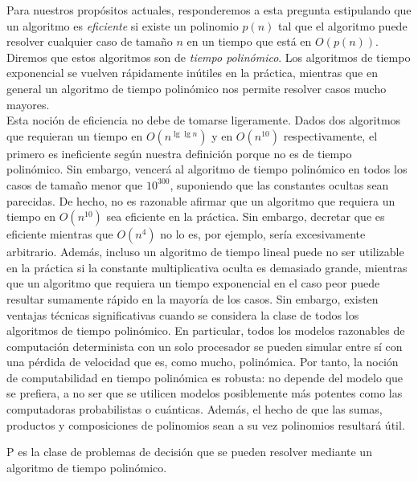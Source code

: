 Para nuestros propósitos actuales, responderemos a esta pregunta estipulando que un algoritmo es \emph{eficiente} si existe un polinomio $p(n)$ tal que el algoritmo puede resolver cualquier caso de tamaño $n$ en un tiempo que está en $O(p(n))$. Diremos que estos algoritmos son de \emph{tiempo polinómico}. Los algoritmos de tiempo exponencial se vuelven rápidamente inútiles en la práctica, mientras que en general un algoritmo de tiempo polinómico nos permite resolver casos mucho mayores.\\

Esta noción de eficiencia no debe de tomarse ligeramente. Dados dos algoritmos que requieran un tiempo en $O(n^{\lg \lg n})$ y en $O(n^{10})$ respectivamente, el primero es ineficiente según nuestra definición porque no es de tiempo polinómico. Sin embargo, vencerá al algoritmo de tiempo polinómico en todos los casos de tamaño menor que $10^{300}$, suponiendo que las constantes ocultas sean parecidas. De hecho, no es razonable afirmar que un algoritmo que requiera un tiempo en $O(n^{10})$ sea eficiente en la práctica. Sin embargo, decretar que es eficiente mientras que $O(n^4)$ no lo es, por ejemplo, sería excesivamente arbitrario. Además, incluso un algoritmo de tiempo lineal puede no ser utilizable en la práctica si la constante multiplicativa oculta es demasiado grande, mientras que un algoritmo que requiera un tiempo exponencial en el caso peor puede resultar sumamente rápido en la mayoría de los casos. Sin embargo, existen ventajas técnicas significativas cuando se considera la clase de todos los algoritmos de tiempo polinómico. En particular, todos los modelos razonables de computación determinista con un solo procesador se pueden simular entre sí con una pérdida de velocidad que es, como mucho, polinómica. Por tanto, la noción de computabilidad en tiempo polinómica es robusta: no depende del modelo que se prefiera, a no ser que se utilicen modelos posiblemente más potentes como las computadoras probabilistas o cuánticas. Además, el hecho de que las sumas, productos y composiciones de polinomios sean a su vez polinomios resultará útil.\\

\begin{fondo}
P es la clase de problemas de decisión que se pueden resolver mediante un algoritmo de tiempo polinómico.
\end{fondo}

